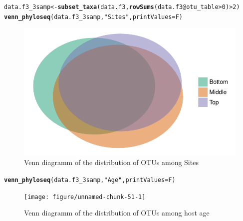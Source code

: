 \documentclass[12pt]{article}\usepackage[]{graphicx}\usepackage[]{color}
\makeatletter
\def\maxwidth{ %
  \ifdim\Gin@nat@width>\linewidth
    \linewidth
  \else
    \Gin@nat@width
  \fi
}
\newcommand{\hlnum}[1]{\textcolor[rgb]{0.686,0.059,0.569}{#1}}%
\newcommand{\hlstr}[1]{\textcolor[rgb]{0.192,0.494,0.8}{#1}}%
\newcommand{\hlopt}[1]{\textcolor[rgb]{0,0,0}{#1}}%
\newcommand{\hlstd}[1]{\textcolor[rgb]{0.345,0.345,0.345}{#1}}%
\newcommand{\hlkwb}[1]{\textcolor[rgb]{0.69,0.353,0.396}{#1}}%
\newcommand{\hlkwc}[1]{\textcolor[rgb]{0.333,0.667,0.333}{#1}}%
\newcommand{\hlkwd}[1]{\textcolor[rgb]{0.737,0.353,0.396}{\textbf{#1}}}%
\newenvironment{kframe}{%
 \def\at@end@of@kframe{}%
 \ifinner\ifhmode%
  \def\at@end@of@kframe{\end{minipage}}%
  \begin{minipage}{\columnwidth}%
 \fi\fi%
 \def\FrameCommand##1{\hskip\@totalleftmargin \hskip-\fboxsep
 \colorbox{shadecolor}{##1}\hskip-\fboxsep
     \hskip-\linewidth \hskip-\@totalleftmargin \hskip\columnwidth}%
 \MakeFramed {\advance\hsize-\width
   \@totalleftmargin\z@ \linewidth\hsize
   \@setminipage}}%
 {\par\unskip\endMakeFramed%
 \at@end@of@kframe}
\newenvironment{knitrout}{}{} %
\numberwithin{figure}{section}
\makeatother
\begin{document}
\begin{knitrout}\small
{}\color{fgcolor}\begin{kframe}
\begin{alltt}
\hlstd{data.f3_3samp} \hlkwb{<-} \hlkwd{subset_taxa}\hlstd{(data.f3,} \hlkwd{rowSums}\hlstd{(data.f3}\hlopt{@}\hlkwc{otu_table}\hlopt{>}\hlnum{0}\hlstd{)}\hlopt{>}\hlnum{2}\hlstd{)}
\hlkwd{venn_phyloseq}\hlstd{(data.f3_3samp,} \hlstr{"Sites"}\hlstd{,} \hlkwc{printValues} \hlstd{= F)}
\end{alltt}
\end{kframe}\begin{figure}

{\centering \includegraphics[width=\maxwidth]{figure/unnamed-chunk-50-1} 

}

\caption[Venn diagramm of the distribution of OTUs among Sites]{Venn diagramm of the distribution of OTUs among Sites}\label{fig:unnamed-chunk-50}
\end{figure}


\end{knitrout}

\begin{knitrout}\small
{}\color{fgcolor}\begin{kframe}
\begin{alltt}
\hlkwd{venn_phyloseq}\hlstd{(data.f3_3samp,} \hlstr{"Age"}\hlstd{,} \hlkwc{printValues} \hlstd{= F)}
\end{alltt}
\end{kframe}\begin{figure}

{\centering \texttt{[image: figure/unnamed-chunk-51-1]} 

}

\caption[Venn diagramm of the distribution of OTUs among host age]{Venn diagramm of the distribution of OTUs among host age}\label{fig:unnamed-chunk-51}
\end{figure}


\end{knitrout}
\end{document}
